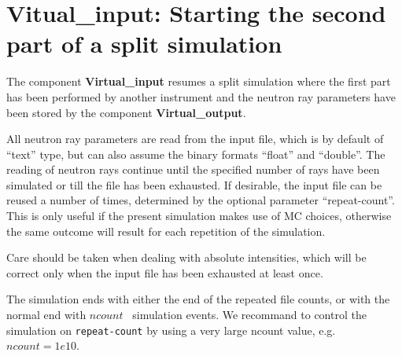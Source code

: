 \section{Vitual\_input: Starting the second part of a split simulation}
\label{virtual_input}


The component {\bf Virtual\_input} resumes a split simulation where the
first part has been performed by another instrument and the neutron ray
parameters have been stored by the component {\bf Virtual\_output}.

All neutron ray parameters are read from the input file, which is by default
of ``text'' type, but can also assume the binary formats
``float'' and ``double''. The reading of neutron rays continue until the
specified number of rays have been simulated or
till the file has been exhausted. If desirable, the input file
can be reused a number of times, determined by the optional parameter
``repeat-count''. This is only useful if the present simulation makes use of
MC choices, otherwise the same outcome will result for each repetition of the
simulation.

Care should be taken when dealing with
absolute intensities, which will be correct only
when the input file has been exhausted at least once.

The simulation ends with either the end of the repeated file counts,
or with the normal end with $ncount$ \MCS\ simulation events. We recommand to
control the simulation on \verb+repeat-count+ by using
a very large ncount value, e.g. $ncount=1e10$.
